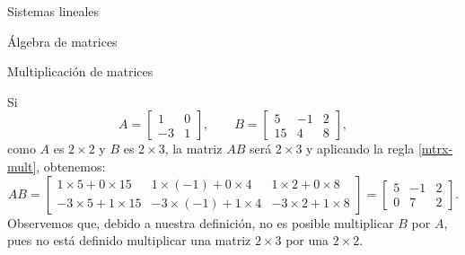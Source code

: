 \begin{chapter}{Sistemas lineales}
\begin{section}{\'Algebra de matrices}
\begin{subsection}{Multiplicaci\'on de matrices}
                \begin{ejemplo*}
                    Si 
                    \begin{equation*}
                        A = \begin{bmatrix}1&0\\-3&1\end{bmatrix}, \qquad B = \begin{bmatrix}5&-1&2\\15&4&8\end{bmatrix},
                    \end{equation*}
                    como $A$ es $2 \times 2$ y $B$ es $2 \times 3$, la matriz $AB$ será $2 \times 3$ y  aplicando la regla \eqref{mtrx-mult}, obtenemos:
                    \begin{equation*}
                        AB = \begin{bmatrix}1\times  5 + 0\times 15&1\times (-1) + 0\times 4&1\times 2 + 0\times 8
                            \\-3\times 5 + 1\times 15&-3\times (-1) + 1\times 4&-3\times 2 + 1\times 8
                        \end{bmatrix} =
                        \begin{bmatrix} 5 &-1 &2 
                            \\ 0 &7 &2
                        \end{bmatrix}.
                    \end{equation*}
                    Observemos que, debido a nuestra definición, no es posible multiplicar $B$ por $A$, pues no está definido multiplicar una matriz $2 \times 3$ por una $2 \times 2$.
                \end{ejemplo*}
                     

\end{subsection}
\end{section}
\end{chapter}
